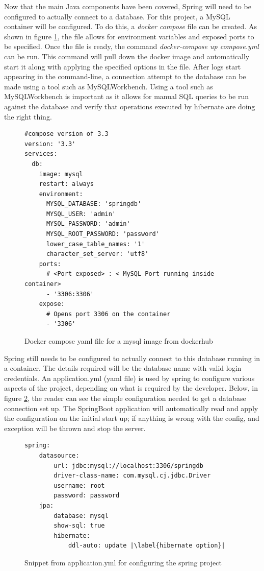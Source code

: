 Now that the main Java components have been covered, Spring will need to be configured to actually connect to a database.
For this project, a MySQL container will be configured. To do this, a \textit{docker compose} file can be created.
As shown in figure \ref{sqldocker}, the file allows for environment variables and exposed ports to be specified.
Once the file is ready, the command \textit{docker-compose up compose.yml} can be run.
This command will pull down the docker image and automatically start it along with applying the specified options in the file.
After logs start appearing in the command-line, a connection attempt to the database can be made using a tool such as MySQLWorkbench.
Using a tool such as MySQLWorkbench is important as it allows for manual SQL queries to be run against the database and verify that operations
executed by hibernate are doing the right thing.


\begin{figure}[ht]
    \centering
    \begin{lstlisting}
#compose version of 3.3        
version: '3.3'
services:
  db:
    image: mysql
    restart: always
    environment:
      MYSQL_DATABASE: 'springdb'
      MYSQL_USER: 'admin'
      MYSQL_PASSWORD: 'admin'
      MYSQL_ROOT_PASSWORD: 'password'
      lower_case_table_names: '1'
      character_set_server: 'utf8'
    ports:
      # <Port exposed> : < MySQL Port running inside container>
      - '3306:3306'
    expose:
      # Opens port 3306 on the container
      - '3306'           
    \end{lstlisting}
    \caption{Docker compose yaml file for a mysql image from dockerhub}
    \label{sqldocker}
\end{figure}

Spring still needs to be configured to actually connect to this database running in a container.
The details required will be the database name with valid login credentials.
An application.yml (yaml file) is used by spring to configure various aspects of the project, depending on what is required by the developer.
Below, in figure \ref{springymldbconfig}, the reader can see the simple configuration needed to get a database connection set up.
The SpringBoot application will automatically read and apply the configuration on the initial start up; if anything is wrong with the config,
and exception will be thrown and stop the server.

\begin{figure}[ht]
    \centering
    \begin{lstlisting}[escapechar=|]
spring:
    datasource:
        url: jdbc:mysql://localhost:3306/springdb
        driver-class-name: com.mysql.cj.jdbc.Driver
        username: root
        password: password
    jpa:
        database: mysql
        show-sql: true
        hibernate:
            ddl-auto: update |\label{hibernate option}|
    \end{lstlisting}
    \caption{Snippet from application.yml for configuring the spring project}
    \label{springymldbconfig}
\end{figure}

